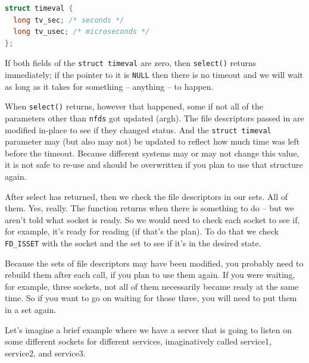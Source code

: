 \documentclass[a4paper]{report}
\begin{document}
\begin{lstlisting}[language=C]
struct timeval {
  long tv_sec; /* seconds */
  long tv_usec; /* microseconds */
};
\end{lstlisting}

If both fields of the \texttt{struct timeval} are zero, then \texttt{select()} returns immediately; if the pointer to it is \texttt{NULL} then there is no timeout and we will wait as long as it takes for something -- anything -- to happen.

When \texttt{select()} returns, however that happened, some if not all of the parameters other than \texttt{nfds} got updated (argh). The file descriptors passed in are modified in-place to see if they changed status.  And the \texttt{struct timeval} parameter may (but also may not) be updated to reflect how much time was left before the timeout. Because different systems may or may not change this value, it is not safe to re-use and should be overwritten if you plan to use that structure again.

After select has returned, then we check the file descriptors in our sets. All of them. Yes, really. The function returns when there is something to do -- but we aren't told what socket is ready. So we would need to check each socket to see if, for example, it's ready for reading (if that's the plan). To do that we check \texttt{FD\_ISSET} with the socket and the set to see if it's in the desired state.

Because the sets of file descriptors may have been modified, you probably need to rebuild them after each call, if you plan to use them again. If you were waiting, for example, three sockets, not all of them necessarily became ready at the same time. So if you want to go on waiting for those three, you will need to put them in a set again.

Let's imagine a brief example where we have a server that is going to listen on some different sockets for different services, imaginatively called service1, service2, and service3.
\end{document}
